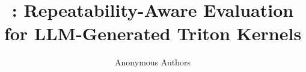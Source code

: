 \documentclass[10pt]{article}
\title{\okf: Repeatability-Aware Evaluation for LLM-Generated Triton Kernels}
\author{Anonymous Authors}
\date{}
\begin{document}
\maketitle

\begin{abstract}

\end{abstract}









\FloatBarrier



\FloatBarrier
\clearpage
\appendix

\end{document}
